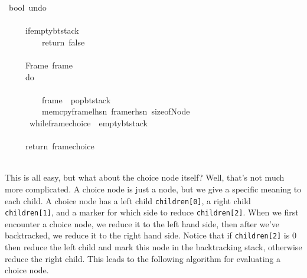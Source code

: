 \documentclass{book}
\theoremstyle{definition}
\begin{document}
{\begin{tabbing}\ttfamily
~bool~undo\\
\ttfamily ~\\
\ttfamily ~~~~~ifemptybtstack\\
\ttfamily ~~~~~~~~~return~false\\
\ttfamily ~\\
\ttfamily ~~~~~Frame~frame\\
\ttfamily ~~~~~do~\\
\ttfamily ~~~~~\\
\ttfamily ~~~~~~~~~frame~~popbtstack\\
\ttfamily ~~~~~~~~~memcpyframelhsn~framerhsn~sizeofNode\\
\ttfamily ~~~~~~whileframechoice~~emptybtstack\\
\ttfamily ~\\
\ttfamily ~~~~~return~framechoice\\
\ttfamily ~
\end{tabbing}

This is all easy, but what about the choice node itself?
Well, that's not much more complicated.
A choice node is just a node, but we give a specific meaning to each child.
A choice node has a left child \texttt{children[0]}, a right child \texttt{children[1]},
and a marker for which side to reduce \texttt{children[2]}.
When we first encounter a choice node, we reduce it to the left hand side,
then after we've backtracked, we reduce it to the right hand side.
Notice that if \texttt{children[2]} is 0 then reduce the left child 
and mark this node in the backtracking stack, otherwise reduce the right child.
This leads to the following algorithm for evaluating a choice node.

}
\end{document}
